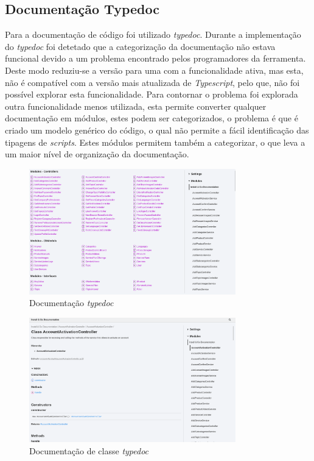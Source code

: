 \subsection{Documentação Typedoc}
Para a documentação de código foi utilizado \textit{typedoc}. Durante a implementação do \textit{typedoc} foi detetado que a categorização da documentação não estava funcional devido a um problema encontrado pelos programadores da ferramenta. Deste modo reduziu-se a versão para uma com a funcionalidade ativa, mas esta, não é compatível com a versão mais atualizada de \textit{Typescript}, pelo que, não foi possível explorar esta funcionalidade. Para contornar o problema foi explorada outra funcionalidade menos utilizada, esta permite converter qualquer documentação em módulos, estes podem ser categorizados, o problema é que é criado um modelo genérico do código, o qual não permite a fácil identificação das tipagens de \textit{scripts}. Estes módulos permitem também a categorizar, o que leva a um maior nível de organização da documentação.

\begin{figure}[htb]
 \centering
 \includegraphics[width=0.8\textwidth]{images/implementacao/api/docs.png}
 \caption{Documentação \textit{typedoc}}
 \label{type_doc}
\end{figure}

\begin{figure}[htb]
 \centering
 \includegraphics[width=0.8\textwidth]{images/implementacao/api/docs_det.png}
 \caption{Documentação de classe \textit{typedoc}}
 \label{type_doc_det}
\end{figure}

